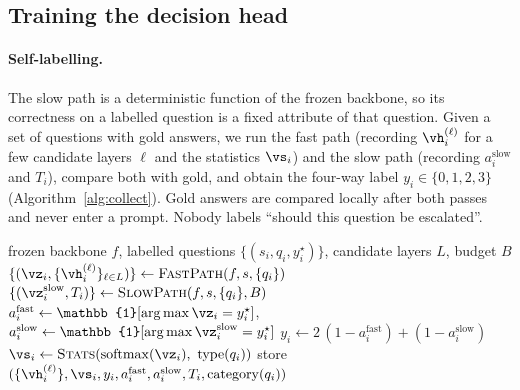 \documentclass{article}
\newcommand{\fast}{\mathrm{fast}}
\newcommand{\slow}{\mathrm{slow}}
\begin{document}
\subsection{Training the decision head}
\label{sec:training}

\paragraph{Self-labelling.}
The slow path is a deterministic function of the frozen backbone, so its correctness on a labelled question is a fixed attribute of that question. Given a set of questions with gold answers, we run the fast path (recording $\vh_i^{(\ell)}$ for a few candidate layers $\ell$ and the statistics $\vs_i$) and the slow path (recording $a_i^{\slow}$ and $T_i$), compare both with gold, and obtain the four-way label $y_i\in\{0,1,2,3\}$ (Algorithm~\ref{alg:collect}). Gold answers are compared locally after both passes and never enter a prompt. Nobody labels ``should this question be escalated''.

\begin{algorithm}[t]
\caption{Self-labelled data collection}
\label{alg:collect}
\begin{algorithmic}[1]
\REQUIRE frozen backbone $f$, labelled questions $\{(s_i,q_i,y^\star_i)\}$, candidate layers $L$, budget $B$
  \STATE $\{(\vz_i,\{\vh_i^{(\ell)}\}_{\ell\in L})\}\leftarrow\textsc{FastPath}(f,s,\{q_i\})$ 
  \STATE $\{(\vz_i^{\slow},T_i)\}\leftarrow\textsc{SlowPath}(f,s,\{q_i\},B)$ 
    \STATE $a_i^{\fast}\leftarrow\mathbb{1}[\arg\max\vz_i=y^\star_i]$,\quad $a_i^{\slow}\leftarrow\mathbb{1}[\arg\max\vz_i^{\slow}=y^\star_i]$
    \STATE $y_i\leftarrow 2\,(1-a_i^{\fast})+(1-a_i^{\slow})$ 
    \STATE $\vs_i\leftarrow\textsc{Stats}(\mathrm{softmax}(\vz_i),\ \mathrm{type}(q_i))$
    \STATE store $(\{\vh_i^{(\ell)}\},\vs_i,y_i,a_i^{\fast},a_i^{\slow},T_i,\mathrm{category}(q_i))$
  \ENDFOR
\ENDFOR
\end{algorithmic}
\end{algorithm}
\end{document}
